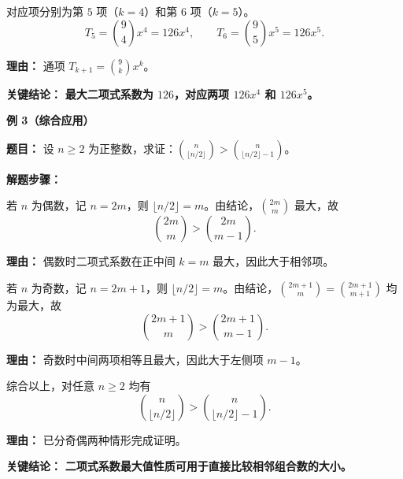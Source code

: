 \begin{examplebox}
\begin{description}[style=nextline, leftmargin=2.8em, labelsep=0.5em, itemsep=0.45em]
		\item[\textbf{第三步（写出两项）：}] 对应项分别为第 $5$ 项（$k=4$）和第 $6$ 项（$k=5$）。
			\[
				T_5 = \binom{9}{4}x^4 = 126x^4,
				\qquad
				T_6 = \binom{9}{5}x^5 = 126x^5.
			\]
			\par\textbf{理由：}
			通项 $T_{k+1}=\binom{9}{k}x^k$。
	\end{description}

	\textbf{\textcolor{CExample}{关键结论：}}
	\textbf{最大二项式系数为 $126$，对应两项 $126x^4$ 和 $126x^5$。}

	\medskip
	\textbf{\textcolor{CExample}{例 3（综合应用）}}

	\textbf{\textcolor{CExample}{题目：}}
	设 $n\ge2$ 为正整数，求证：$\displaystyle \binom{n}{\lfloor n/2\rfloor} > \binom{n}{\lfloor n/2\rfloor - 1}$。

	\textbf{\textcolor{CExample}{解题步骤：}}
	\begin{description}[style=nextline, leftmargin=2.8em, labelsep=0.5em, itemsep=0.45em]
		\item[\textbf{第一步（偶数情形）：}] 若 $n$ 为偶数，记 $n=2m$，则 $\lfloor n/2\rfloor = m$。由结论，$\binom{2m}{m}$ 最大，故
			\[
				\binom{2m}{m} > \binom{2m}{m-1}.
			\]
			\par\textbf{理由：}
			偶数时二项式系数在正中间 $k=m$ 最大，因此大于相邻项。

		\item[\textbf{第二步（奇数情形）：}] 若 $n$ 为奇数，记 $n=2m+1$，则 $\lfloor n/2\rfloor = m$。由结论，$\binom{2m+1}{m}=\binom{2m+1}{m+1}$ 均为最大，故
			\[
				\binom{2m+1}{m} > \binom{2m+1}{m-1}.
			\]
			\par\textbf{理由：}
			奇数时中间两项相等且最大，因此大于左侧项 $m-1$。

		\item[\textbf{第三步（总结）：}] 综合以上，对任意 $n\ge2$ 均有
			\[
				\binom{n}{\lfloor n/2\rfloor} > \binom{n}{\lfloor n/2\rfloor - 1}.
			\]
			\par\textbf{理由：}
			已分奇偶两种情形完成证明。
	\end{description}

	\textbf{\textcolor{CExample}{关键结论：}}
	\textbf{二项式系数最大值性质可用于直接比较相邻组合数的大小。}
\end{examplebox}
